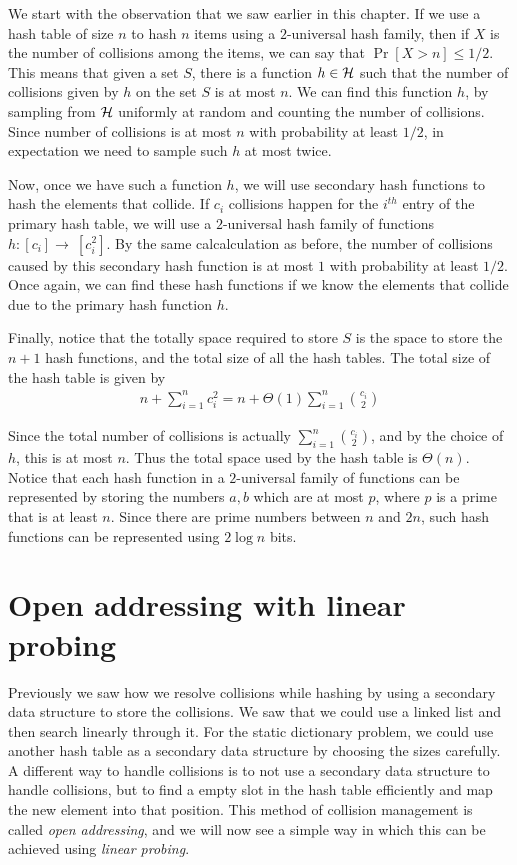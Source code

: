 We start with the observation that we saw earlier in this chapter. If we use a
hash table of size $n$ to hash $n$ items using a $2$-universal hash family, then
if $X$ is the number of collisions among the items, we can say that
$\Pr[X > n] \leq 1/2$. This means that given a set $S$, there is a function
$h\in {\cal H}$ such that the number of collisions given by $h$ on the set $S$
is at most $n$. We can find this function $h$, by sampling from ${\cal H}$
uniformly at random and counting the number of collisions. Since number of
collisions is at most $n$ with probability at least $1/2$, in expectation we
need to sample such $h$ at most twice.

Now, once we have such a function $h$, we will use secondary hash functions to
hash the elements that collide. If $c_i$ collisions happen for the $i^{th}$
entry of the primary hash table, we will use a $2$-universal hash family of
functions $h:[c_i] \to~[c_i^2]$. By the same calcalculation as before, the
number of collisions caused by this secondary hash function is at most $1$ with
probability at least $1/2$. Once again, we can find these hash functions if we
know the elements that collide due to the primary hash function $h$.

Finally, notice that the totally space required to store $S$ is the space to
store the $n+1$ hash functions, and the total size of all the hash tables. The
total size of the hash table is given by
\begin{align*}
  n + \sum_{i=1}^n c_i^2 = n + \Theta(1) \sum_{i=1}^n \binom{c_i}{2}
\end{align*}

Since the total number of collisions is actually $\sum_{i=1}^n \binom{c_i}{2}$,
and by the choice of $h$, this is at most $n$. Thus the total space used by the
hash table is $\Theta(n)$. Notice that each hash function in a $2$-universal
family of functions can be represented by storing the numbers $a, b$ which are
at most $p$, where $p$ is a prime that is at least $n$. Since there are prime
numbers between $n$ and $2n$, such hash functions can be represented using
$2\log n$ bits. 

\section{Open addressing with linear probing}

Previously we saw how we resolve collisions while hashing by using a secondary
data structure to store the collisions. We saw that we could use a linked list
and then search linearly through it. For the static dictionary problem, we could
use another hash table as a secondary data structure by choosing the sizes
carefully. A different way to handle collisions is to not use a secondary data
structure to handle collisions, but to find a empty slot in the hash table
efficiently and map the new element into that position. This method of collision
management is called \emph{open addressing}, and we will now see a simple way in
which this can be achieved using \emph{linear probing}.


